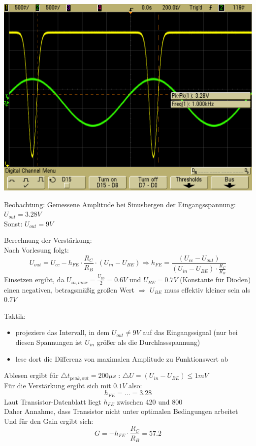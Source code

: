 \documentclass[compress,11pt]{beamer}
\begin{document}
\begin{frame}

\includegraphics[width=.7\textwidth]{../daten/oszi/scope_45}\\
\begin{block}{Beobachtung:}
Gemessene Amplitude bei Sinusbergen der Eingangsspannung: $U_{out} = 3.28 V$\\
Sonst: $U_{out} = 9 V$
\end{block}
\end{frame}
\begin{frame}
Berechnung der Verstärkung:\\
Nach Vorlesung folgt:
\begin{equation}
U_{out} = U_{cc} - h_{FE} \cdot \frac{R_C}{R_B} \cdot (U_{in} - U_{BE}) \Rightarrow h_{FE} = \frac{(U_{cc} - U_{out})}{(U_{in} - U_{BE}) \cdot \frac{R_C}{R_B}}
\end{equation}
Einsetzen ergibt, da $U_{in,max} = \frac{U_{pp}}{2} = 0.6 V$ und $U_{BE} = 0.7 V$ (Konstante für Dioden) einen negativen, betragsmäßig großen Wert $\Rightarrow$ $U_{BE}$ muss effektiv kleiner sein als $0.7 V$\\
\end{frame}
\begin{frame}

Taktik:
\begin{itemize}
\item projeziere das Intervall, in dem $U_{out} \neq 9 V$ auf das Eingangssignal (nur bei diesen Spannungen ist $U_{in}$ größer als die Durchlassspannung)
\item lese dort die Differenz von maximalen Amplitude zu Funktionswert ab
\end{itemize}


\end{frame}
\begin{frame}
Ablesen ergibt für $\bigtriangleup t_{peak,out} = 200 \mu s$ : $\bigtriangleup U = (U_{in} - U_{BE}) \leq 1 mV$ \\ Für die Verstärkung ergibt sich mit $0.1 V$ also:
\begin{equation}
h_{FE} = \dots 	= 3.28
\end{equation}
Laut Transistor-Datenblatt liegt $h_{FE}$ zwischen 420 und 800\\
Daher Annahme, dass Transistor nicht unter optimalen Bedingungen arbeitet\\
Und für den Gain ergibt sich:
\begin{equation}
G = -h_{FE} \cdot \frac{R_C}{R_B} = 57.2
\end{equation}
\end{frame}
\end{document}
